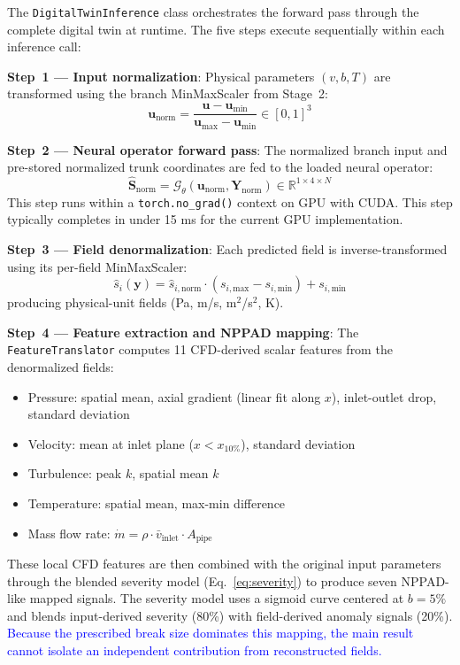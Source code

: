 \documentclass[journal]{IEEEtran}
\newcommand{\added}[1]{\textcolor{blue}{#1}}
\begin{document}
The \texttt{DigitalTwinInference} class orchestrates the forward pass through the complete digital twin at runtime. The five steps execute sequentially within each inference call:

\textbf{Step~1 --- Input normalization}: Physical parameters $(v, b, T)$ are transformed using the branch MinMaxScaler from Stage~2:
\begin{equation}
\bm{u}_\text{norm} = \frac{\bm{u} - \bm{u}_\text{min}}{\bm{u}_\text{max} - \bm{u}_\text{min}} \in [0,1]^3
\end{equation}

\textbf{Step~2 --- Neural operator forward pass}: The normalized branch input and pre-stored normalized trunk coordinates are fed to the loaded neural operator:
\begin{equation}
\hat{\bm{S}}_\text{norm} = \mathcal{G}_\theta(\bm{u}_\text{norm}, \bm{Y}_\text{norm}) \in \mathbb{R}^{1 \times 4 \times N}
\end{equation}
This step runs within a \texttt{torch.no\_grad()} context on GPU with CUDA. This step typically completes in under 15 ms for the current GPU implementation.

\textbf{Step~3 --- Field denormalization}: Each predicted field is inverse-transformed using its per-field MinMaxScaler:
\begin{equation}
\hat{s}_i(\bm{y}) = \hat{s}_{i,\text{norm}} \cdot (s_{i,\text{max}} - s_{i,\text{min}}) + s_{i,\text{min}}
\end{equation}
producing physical-unit fields (Pa, m/s, m$^2$/s$^2$, K).

\textbf{Step~4 --- Feature extraction and NPPAD mapping}: The \texttt{FeatureTranslator} computes 11 CFD-derived scalar features from the denormalized fields:
\begin{itemize}
    \item Pressure: spatial mean, axial gradient (linear fit along $x$), inlet-outlet drop, standard deviation
    \item Velocity: mean at inlet plane ($x < x_{10\%}$), standard deviation
    \item Turbulence: peak $k$, spatial mean $k$
    \item Temperature: spatial mean, max-min difference
    \item Mass flow rate: $\dot{m} = \rho \cdot \bar{v}_\text{inlet} \cdot A_\text{pipe}$
\end{itemize}

These local CFD features are then combined with the original input parameters through the blended severity model (Eq.~\ref{eq:severity}) to produce seven NPPAD-like mapped signals. The severity model uses a sigmoid curve centered at $b = 5\%$ and blends input-derived severity (80\%) with field-derived anomaly signals (20\%).  \added{Because the prescribed break size dominates this mapping, the main result cannot isolate an independent contribution from reconstructed fields.}
\end{document}
